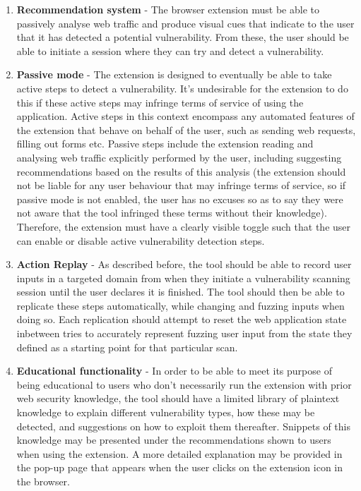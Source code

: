\begin{enumerate}
	\item \textbf{Recommendation system} - The browser extension must be able to passively analyse web traffic and produce visual cues that indicate to the user that it has detected a potential vulnerability. From these, the user should be able to initiate a session where they can try and detect a vulnerability.
	
	\item \textbf{Passive mode} - The extension is designed to eventually be able to take active steps to detect a vulnerability. It's undesirable for the extension to do this if these active steps may infringe terms of service of using the application. Active steps in this context encompass any automated features of the extension that behave on behalf of the user, such as sending web requests, filling out forms etc. Passive steps include the extension reading and analysing web traffic explicitly performed by the user, including suggesting recommendations based on the results of this analysis (the extension should not be liable for any user behaviour that may infringe terms of service, so if passive mode is not enabled, the user has no excuses so as to say they were not aware that the tool infringed these terms without their knowledge). Therefore, the extension must have a clearly visible toggle such that the user can enable or disable active vulnerability detection steps. 
	
	\item \textbf{Action Replay} - As described before, the tool should be able to record user inputs in a targeted domain from when they initiate a vulnerability scanning session until the user declares it is finished. The tool should then be able to replicate these steps automatically, while changing and fuzzing inputs when doing so. Each replication should attempt to reset the web application state inbetween tries to accurately represent fuzzing user input from the state they defined as a starting point for that particular scan.
	
	\item \textbf{Educational functionality} - In order to be able to meet its purpose of being educational to users who don't necessarily run the extension with prior web security knowledge, the tool should have a limited library of plaintext knowledge to explain different vulnerability types, how these may be detected, and suggestions on how to exploit them thereafter. Snippets of this knowledge may be presented under the recommendations shown to users when using the extension. A more detailed explanation may be provided in the pop-up page that appears when the user clicks on the extension icon in the browser.
\end{enumerate}




